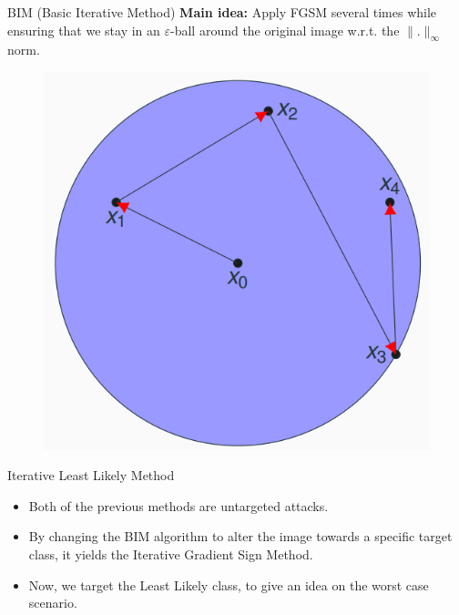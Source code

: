 \documentclass{beamer}
\begin{document}
\begin{frame}{BIM (Basic Iterative Method) }
    \textbf{Main idea:} Apply FGSM several times while ensuring that we stay in an $\varepsilon$-ball around the original image w.r.t. the $\|.\|_\infty$ norm.
        \begin{figure}[H]
        \centering
        \includegraphics[width=0.5\linewidth]{images/BIM.PNG}
    \end{figure}
\end{frame}

\begin{frame}{Iterative Least Likely Method}
\begin{itemize}
    \item Both of the previous methods are untargeted attacks.
    \item By changing the BIM algorithm to alter the image towards a specific target class, it yields the Iterative Gradient Sign Method.
    \item Now, we target the Least Likely class, to give an idea on the worst case scenario.
\end{itemize}
\end{frame}
\end{document}
